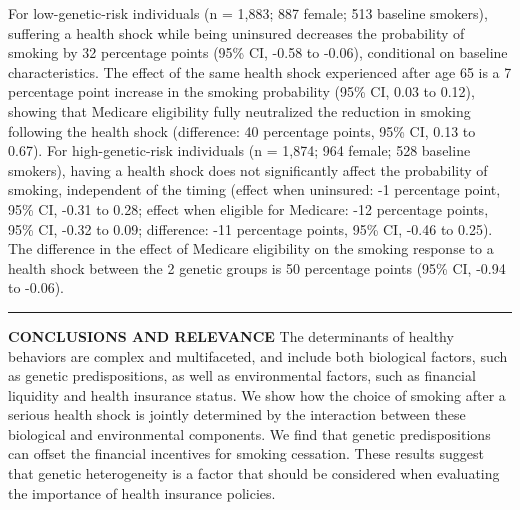 \documentclass[12pt]{article}
\begin{document}
\begin{mdframed}[backgroundcolor=black!6,linecolor=NavyBlue,leftline=false,rightline=false,bottomline=false, topline=false]
{\begin{flushleft}
For low-genetic-risk individuals (n = 1,883; 887 female; 513 baseline smokers), suffering a health shock while being uninsured decreases the probability of smoking by 32 percentage points (95\% CI, -0.58 to -0.06), conditional on baseline characteristics. The effect of the same health shock experienced after age 65 is a 7 percentage point increase in the smoking probability (95\% CI, 0.03 to 0.12), showing that Medicare eligibility fully neutralized the reduction in smoking following the health shock (difference: 40 percentage points, 95\% CI, 0.13 to 0.67). For high-genetic-risk individuals (n = 1,874; 964 female; 528 baseline smokers), having a health shock does not significantly affect the probability of smoking, independent of the timing (effect when uninsured: -1 percentage point, 95\% CI,  -0.31 to 0.28; effect when eligible for Medicare: -12 percentage points, 95\% CI, -0.32 to 0.09; difference: -11 percentage points, 95\% CI, -0.46 to 0.25). The difference in the effect of Medicare eligibility on the smoking response to a health shock between the 2 genetic groups is 50 percentage points (95\% CI, -0.94 to -0.06).
\noindent\textcolor{white}{\rule{16cm}{0.5mm}}
%
\textbf{\textcolor{NavyBlue}{CONCLUSIONS AND RELEVANCE}}
The determinants of healthy behaviors are complex and multifaceted, and include both biological factors, such as genetic predispositions, as well as environmental factors, such as financial liquidity and health insurance status.
We show how the choice of smoking after a serious health shock is jointly determined by the interaction between these biological and environmental components. We find that genetic predispositions can offset the financial incentives for smoking cessation.
These results suggest that genetic heterogeneity is a factor that should be considered when evaluating the importance of health insurance policies.
\end{flushleft}
}
\end{mdframed}


\setcounter{page}{1}

\pagebreak \newpage


\singlespacing
\end{document}

